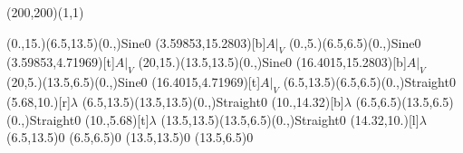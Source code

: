 \unitlength=1bp%

\begin{feynartspicture}(200,200)(1,1)

\FADiagram{}
\FAProp(0.,15.)(6.5,13.5)(0.,){Sine}{0}
\FALabel(3.59853,15.2803)[b]{$A|_V$}
\FAProp(0.,5.)(6.5,6.5)(0.,){Sine}{0}
\FALabel(3.59853,4.71969)[t]{$A|_V$}
\FAProp(20,15.)(13.5,13.5)(0.,){Sine}{0}
\FALabel(16.4015,15.2803)[b]{$A|_V$}
\FAProp(20,5.)(13.5,6.5)(0.,){Sine}{0}
\FALabel(16.4015,4.71969)[t]{$A|_V$}
\FAProp(6.5,13.5)(6.5,6.5)(0.,){Straight}{0}
\FALabel(5.68,10.)[r]{$\lambda$}
\FAProp(6.5,13.5)(13.5,13.5)(0.,){Straight}{0}
\FALabel(10.,14.32)[b]{$\lambda$}
\FAProp(6.5,6.5)(13.5,6.5)(0.,){Straight}{0}
\FALabel(10.,5.68)[t]{$\lambda$}
\FAProp(13.5,13.5)(13.5,6.5)(0.,){Straight}{0}
\FALabel(14.32,10.)[l]{$\lambda$}
\FAVert(6.5,13.5){0}
\FAVert(6.5,6.5){0}
\FAVert(13.5,13.5){0}
\FAVert(13.5,6.5){0}
\end{feynartspicture}


